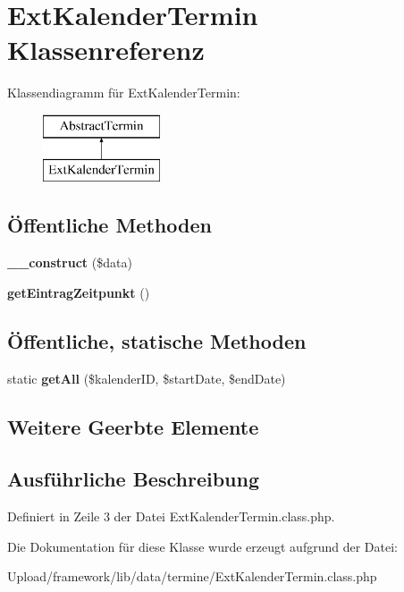 \hypertarget{class_ext_kalender_termin}{}\section{Ext\+Kalender\+Termin Klassenreferenz}
\label{class_ext_kalender_termin}
Klassendiagramm für Ext\+Kalender\+Termin\+:\begin{figure}[H]
\begin{center}
\leavevmode
\includegraphics[height=2.000000cm]{class_ext_kalender_termin}
\end{center}
\end{figure}
\subsection*{Öffentliche Methoden}
\begin{DoxyCompactItemize}
\item 
\mbox{\label{class_ext_kalender_termin_a47278e4f0536728549af51711da2d6e5}} 
{\bfseries \+\_\+\+\_\+construct} (\$data)
\item 
\mbox{\label{class_ext_kalender_termin_a459092e3aaef93418e355254cac2fac1}} 
{\bfseries get\+Eintrag\+Zeitpunkt} ()
\end{DoxyCompactItemize}
\subsection*{Öffentliche, statische Methoden}
\begin{DoxyCompactItemize}
\item 
\mbox{\label{class_ext_kalender_termin_a8ff6cd6bc31d154d36a17e7e34ee3151}} 
static {\bfseries get\+All} (\$kalender\+ID, \$start\+Date, \$end\+Date)
\end{DoxyCompactItemize}
\subsection*{Weitere Geerbte Elemente}


\subsection{Ausführliche Beschreibung}


Definiert in Zeile 3 der Datei Ext\+Kalender\+Termin.\+class.\+php.



Die Dokumentation für diese Klasse wurde erzeugt aufgrund der Datei\+:\begin{DoxyCompactItemize}
\item 
Upload/framework/lib/data/termine/Ext\+Kalender\+Termin.\+class.\+php\end{DoxyCompactItemize}
